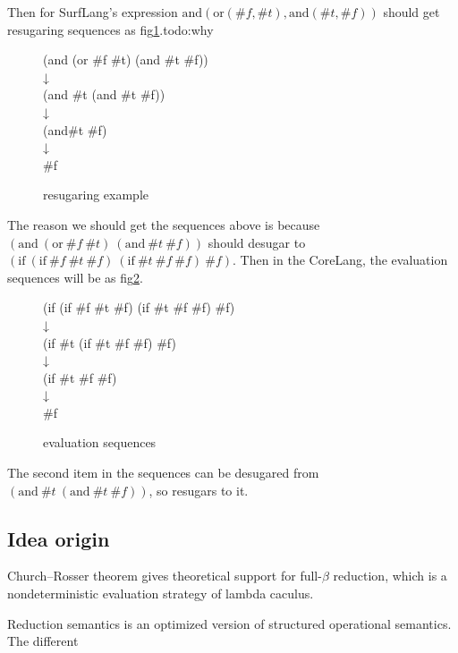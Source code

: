 Then for SurfLang's expression $\mbox{and}(\mbox{or}(\#f, \#t), \mbox{and}(\#t, \#f))$ should get resugaring sequences as fig\ref{fig:example}.todo:why

\begin{figure}[ht]
\parbox[t]{\textwidth}{
			\begin{center}  
				(and (or \#f \#t) (and \#t \#f))\\
				↓\\
				(and \#t (and \#t \#f))\\
				↓\\
				(and\#t \#f)\\
				↓\\
				\#f
			\end{center}  
		}
\caption{resugaring example}
\label{fig:example}
\end{figure}

The reason we should get the sequences above is because $(\mbox{and}~(\mbox{or}~\#f~\#t)~(\mbox{and}~\#t~\#f))$ should desugar to $(\mbox{if}~(\mbox{if}~\#f~\#t~\#f)~(\mbox{if}~\#t~\#f~\#f)~\#f)$. Then in the CoreLang, the evaluation sequences will be as fig\ref{fig:coreseq}.

\begin{figure}[ht]
\parbox[t]{\textwidth}{
			\begin{center}  
				(if (if \#f \#t \#f) (if \#t \#f \#f) \#f)\\
				↓\\
				(if \#t (if \#t \#f \#f) \#f)\\
				↓\\
				(if \#t \#f \#f)\\
				↓\\
				\#f
			\end{center}  
		}
\caption{evaluation sequences}
\label{fig:coreseq}
\end{figure}

The second item in the sequences can be desugared from $(\mbox{and}~\#t~(\mbox{and}~\#t~\#f))$, so resugars to it.
\subsection{Idea origin}
Church–Rosser theorem\cite{churchrosser} gives theoretical support for full-$\beta$ reduction, which is a nondeterministic evaluation strategy of lambda caculus. 

Reduction semantics\cite{reduction} is an optimized version of structured operational semantics\cite{PLOTKIN}. The different

